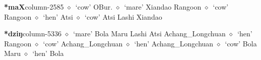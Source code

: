   \item {\footnotesize \textbf{*maX}}{\tiny column-2585}
         $\diamond$~`cow'
         OBur. 
\hspace{1ex}
         $\diamond$~`mare'
         Xiandao 
\hspace{1ex}
         Rangoon 
\hspace{1ex}
         $\diamond$~`cow'
         Rangoon 
\hspace{1ex}
         $\diamond$~`hen'
         Atsi 
\hspace{1ex}
         $\diamond$~`cow'
         Atsi 
\hspace{1ex}
         Lashi 
\hspace{1ex}
         Xiandao 
  \item {\footnotesize \textbf{*dziŋ}}{\tiny column-5336}
         $\diamond$~`mare'
         Bola 
\hspace{1ex}
         Maru 
\hspace{1ex}
         Lashi 
\hspace{1ex}
         Atsi 
\hspace{1ex}
         Achang\_Longchuan 
\hspace{1ex}
         $\diamond$~`hen'
         Rangoon 
\hspace{1ex}
         $\diamond$~`cow'
         Achang\_Longchuan 
\hspace{1ex}
         $\diamond$~`hen'
         Achang\_Longchuan 
\hspace{1ex}
         $\diamond$~`cow'
         Bola 
\hspace{1ex}
         Maru 
\hspace{1ex}
         $\diamond$~`hen'
         Bola 
